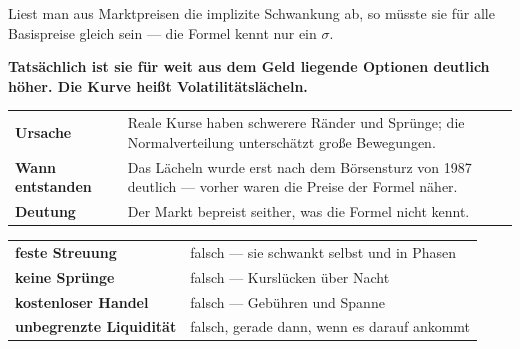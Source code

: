 \begin{warnung}
Liest man aus Marktpreisen die implizite Schwankung ab, so müsste sie für alle Basispreise gleich sein --- die Formel kennt nur ein $\sigma$.

\begin{center}
\begin{minipage}{0.9\textwidth}
\textbf{Tatsächlich ist sie für weit aus dem Geld liegende Optionen deutlich höher. Die Kurve heißt Volatilitätslächeln.}
\end{minipage}
\end{center}

\begin{center}
{\small
\renewcommand{\arraystretch}{1.52}
\begin{tabular}{@{}P{2.6cm}P{6.0cm}@{}}
\toprule
\textbf{Ursache} & Reale Kurse haben schwerere Ränder und Sprünge; die Normalverteilung unterschätzt große Bewegungen.\\
\textbf{Wann entstanden} & Das Lächeln wurde erst nach dem Börsensturz von 1987 deutlich --- vorher waren die Preise der Formel näher.\\
\textbf{Deutung} & Der Markt bepreist seither, was die Formel nicht kennt.\\
\bottomrule
\end{tabular}}
\end{center}

\begin{center}
\begin{minipage}{0.88\textwidth}
\end{minipage}
\end{center}

\begin{center}
{\small
\renewcommand{\arraystretch}{1.5}
\begin{tabular}{@{}P{2.6cm}P{6.0cm}@{}}
\toprule
\textbf{feste Streuung} & falsch --- sie schwankt selbst und in Phasen\\
\textbf{keine Sprünge} & falsch --- Kurslücken über Nacht\\
\textbf{kostenloser Handel} & falsch --- Gebühren und Spanne\\
\textbf{unbegrenzte Liquidität} & falsch, gerade dann, wenn es darauf ankommt\\
\bottomrule
\end{tabular}}
\end{center}


\end{warnung}
